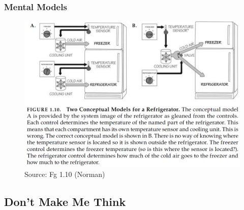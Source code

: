 \documentclass{beamer}
\begin{document}
\begin{frame}
\frametitle{Mental Models}
\centering
\begin{figure}
	\includegraphics[width=0.7\linewidth]{model3}
	\caption{Source: Fg 1.10 (Norman)}
\end{figure}
\end{frame}



\subsection{Don't Make Me Think}
\end{document}
